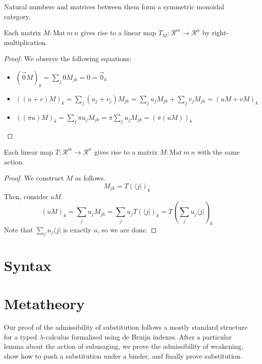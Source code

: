 \documentclass[acmsmall,review]{acmart}
\begin{document}
\begin{lemma}
  Natural numbers and matrices between them form a symmetric monoidal category.
\end{lemma}

\begin{lemma}
  Each matrix $M : \mathrm{Mat}~m~n$ gives rise to a linear map
  $T_M : \mathscr R^m \to \mathscr R^n$ by right-multiplication.
\end{lemma}
\begin{proof}
  We observe the following equations:
  \begin{itemize}
  \item $\left(\vec 0M\right)_{k} = \sum_j 0M_{jk} = 0 = \vec 0_{k}$
  \item $\left((u + v)M\right)_{k} = \sum_j \left(u_j + v_j\right)M_{jk} =
    \sum_j u_jM_{jk} + \sum_j v_jM_{jk} = (uM + vM)_{k}$
  \item $\left((\pi u)M\right)_{k} = \sum_j \pi u_jM_{jk} =
    \pi\sum_j u_jM_{jk} = \left(\pi(uM)\right)_{k}$
  \end{itemize}
\end{proof}

\begin{lemma}
  Each linear map $T : \mathscr R^m \to \mathscr R^n$ gives rise to a matrix
  $M : \mathrm{Mat}~m~n$ with the same action.
\end{lemma}
\begin{proof}
  We construct $M$ as follows.
  \[
    M_{jk} = T(\langle j \rvert)_k
  \]
  Then, consider $uM$.
  \[
    (uM)_k = \sum_j u_jM_{jk} = \sum_j u_jT\left(\langle j \rvert\right)_k
    = T\left(\sum_j u_j\langle j \rvert\right)_k
  \]
  Note that $\sum_j u_j\langle j \rvert$ is exactly $u$, so we are done.
\end{proof}

\section{Syntax}

\section{Metatheory}

Our proof of the admissibility of substitution follows a mostly standard
structure for a typed $\lambda$-calculus formalised using de Bruijn indexes.
After a particular lemma about the action of subusaging, we prove the
admissibility of weakening, show how to push a substitution under a binder, and
finally prove substitution.
\end{document}

